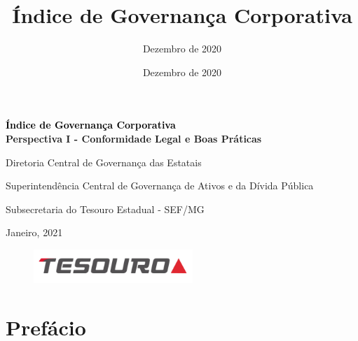 


\title{Índice de Governança Corporativa}%
\date{Dezembro de 2020}%

\author{Dezembro de 2020}

%

%
%
\begin{titlepage}
\BgThispage
{}
\vspace*{0.30\textheight}
\noindent
\begin{center}
\textcolor{black}{{\Huge\textbf{Índice de Governança Corporativa}}\\ 
\vspace{20pt}}
\Large\textbf{Perspectiva I - Conformidade Legal e Boas Práticas}
\end{center}



\vspace{40pt}

\large{    
Diretoria Central de Governança das Estatais
    
Superintendência Central de Governança de Ativos e da Dívida Pública
    
Subsecretaria do Tesouro Estadual - SEF/MG}
    
\vspace{40pt}
    
Janeiro, 2021

\begin{figure}[b]    
\begin{flushright}
\includegraphics[width=60mm]{figures/logo-tesouro-peq.png}
\end{flushright}
\end{figure}
	
\end{titlepage}
\restoregeometry
%
	
\tableofcontents %
\clearpage
	
\chapter*{Prefácio}

